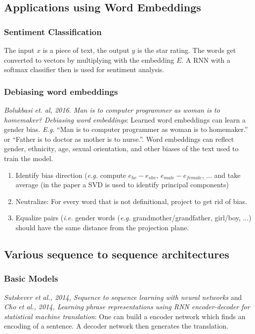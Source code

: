 \documentclass{article}
\begin{document}
\subsection{Applications using Word Embeddings}
\subsubsection{Sentiment Classification}
The input $x$ is a piece of text, the output $y$ is the star rating.
The words get converted to vectors by multiplying with the embedding $E$.
A RNN with a softmax classifier then is used for sentiment analysis.

\subsubsection{Debiasing word embeddings}
\emph{Bolukbasi et. al, 2016. Man is to computer programmer as woman is to homemaker? Debiasing word embeddings}:
Learned word embeddings can learn a gender bias.
\emph{E.g.} ``Man is to computer programmer as woman is to homemaker.'' or
``Father is to doctor as mother is to nurse.''.
Word embeddings can reflect gender, ethnicity, age, sexual orientation, and other biases of the text used to train the model.
\begin{enumerate}
  \item Identify bias direction (\emph{e.g.} compute $e_{he}-e_{she}$, $e_{male}-e_{female}$, ... and take average
    (in the paper a SVD is used to identify principal components)
  \item Neutralize: For every word that is not definitional, project to get rid of bias.
  \item Equalize pairs (\emph{i.e.} gender words (\emph{e.g.} grandmother/grandfather, girl/boy, ...)
    should have the same distance from the projection plane.
\end{enumerate}

\subsection{Various sequence to sequence architectures}
\subsubsection{Basic Models}
\emph{Sutskever et al., 2014, Sequence to sequence learning with neural networks} and
\emph{Cho et al., 2014, Learning phrase representations using RNN encoder-decoder for statistical machine translation}:
One can build a encoder network which finds an encoding of a sentence.
A decoder network then generates the translation.
\end{document}
